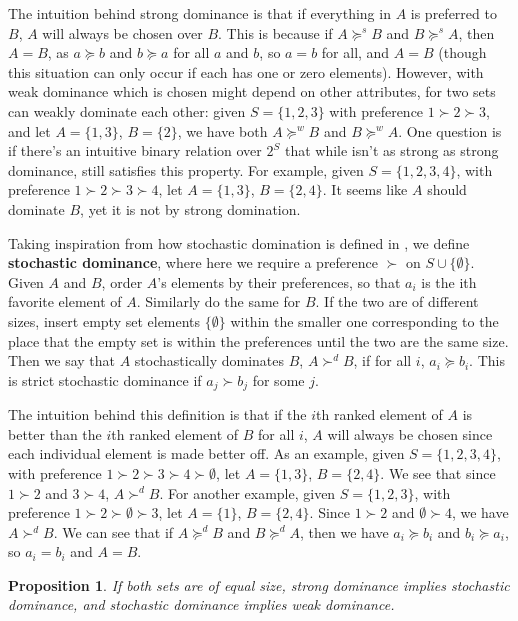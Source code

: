 \documentclass[12pt,letterpaper]{extarticle}
\newtheorem{prop}{Proposition}
\begin{document}
The intuition behind strong dominance is that if everything in $A$ is preferred to $B$, $A$ will always be chosen over $B$. This is because if $A \succcurlyeq^s B$ and $B \succcurlyeq^s A$, then $A = B$, as $a \succcurlyeq b$ and $b \succcurlyeq a$ for all $a$ and $b$, so $a = b$ for all, and $A = B$ (though this situation can only occur if each has one or zero elements). However, with weak dominance which is chosen might depend on other attributes, for two sets can weakly dominate each other: given $S = \{1,2,3\}$ with preference $1 \succ 2 \succ 3$, and let $A = \{1,3\}$, $B = \{2\}$, we have both $A \succcurlyeq^w B$ and $B \succcurlyeq^w A$. One question is if there's an intuitive binary relation over $2^S$ that while isn't as strong as strong dominance, still satisfies this property. For example, given $S = \{1,2,3,4\}$, with preference $1 \succ 2 \succ 3 \succ 4$, let $A = \{1,3\}$, $B = \{2,4\}$. It seems like $A$ should dominate $B$, yet it is not by strong domination.

Taking inspiration from how stochastic domination is defined in \cite{w6}, we define \textbf{stochastic dominance}, where here we require a preference $\succ$ on $S \cup \{\emptyset\}$. Given $A$ and $B$, order $A$'s elements by their preferences, so that $a_i$ is the ith favorite element of $A$. Similarly do the same for $B$. If the two are of different sizes, insert empty set elements $\{\emptyset\}$ within the smaller one corresponding to the place that the empty set is within the preferences until the two are the same size. Then we say that $A$ stochastically dominates $B$, $A \succ^d B$, if for all $i$, $a_i \succcurlyeq b_i$. This is strict stochastic dominance if $a_j \succ b_j$ for some $j$.

The intuition behind this definition is that if the $i$th ranked element of $A$ is better than the $i$th ranked element of $B$ for all $i$, $A$ will always be chosen since each individual element is made better off. As an example, given $S = \{1,2,3,4\}$, with preference $1 \succ 2 \succ 3 \succ 4 \succ \emptyset$, let $A = \{1,3\}$, $B = \{2,4\}$. We see that since $1 \succ 2$ and $3 \succ 4$, $A \succ^d B$. For another example, given $S = \{1,2,3\}$, with preference $1 \succ 2 \succ \emptyset \succ 3$, let $A = \{1\}$, $B = \{2,4\}$. Since $1 \succ 2$ and $\emptyset \succ 4$, we have $A \succ^d B$. We can see that if $A \succcurlyeq^d B$ and $B \succcurlyeq^d A$, then we have $a_i \succcurlyeq b_i$ and $b_i \succcurlyeq a_i$, so $a_i = b_i$ and $A = B$.

\begin{prop}
If both sets are of equal size, strong dominance implies stochastic dominance, and stochastic dominance implies weak dominance.
\end{prop}
\end{document}
